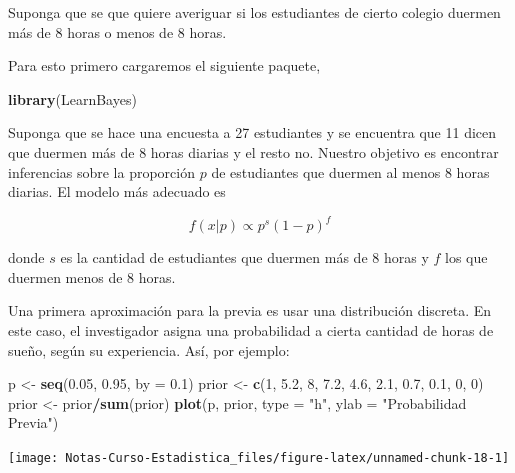 \documentclass[
  12pt,
]{book}
\newenvironment{Shaded}{\begin{snugshade}}{\end{snugshade}}
\newcommand{\DataTypeTok}[1]{\textcolor[rgb]{0.13,0.29,0.53}{#1}}
\newcommand{\DecValTok}[1]{\textcolor[rgb]{0.00,0.00,0.81}{#1}}
\newcommand{\FloatTok}[1]{\textcolor[rgb]{0.00,0.00,0.81}{#1}}
\newcommand{\KeywordTok}[1]{\textcolor[rgb]{0.13,0.29,0.53}{\textbf{#1}}}
\newcommand{\NormalTok}[1]{#1}
\newcommand{\OperatorTok}[1]{\textcolor[rgb]{0.81,0.36,0.00}{\textbf{#1}}}
\newcommand{\StringTok}[1]{\textcolor[rgb]{0.31,0.60,0.02}{#1}}
\begin{document}
Suponga que se que quiere averiguar si los estudiantes de cierto colegio duermen más de 8 horas o menos de 8 horas.

Para esto primero cargaremos el siguiente paquete,

\begin{Shaded}
\begin{Highlighting}[]
\KeywordTok{library}\NormalTok{(LearnBayes)}
\end{Highlighting}
\end{Shaded}

Suponga que se hace una encuesta a 27 estudiantes y se encuentra que 11 dicen que duermen más de 8 horas diarias y el resto no. Nuestro objetivo es encontrar inferencias sobre la proporción \(p\) de estudiantes que duermen al menos 8 horas diarias. El modelo más adecuado es

\[
f(x \vert p) \propto p^s (1-p)^f
\]

donde \(s\) es la cantidad de estudiantes que duermen más de 8 horas y \(f\) los que duermen menos de 8 horas.

Una primera aproximación para la previa es usar una distribución discreta. En este caso, el investigador asigna una probabilidad a cierta cantidad de horas de sueño, según su experiencia. Así, por ejemplo:

\begin{Shaded}
\begin{Highlighting}[]
\NormalTok{p \textless{}{-}}\StringTok{ }\KeywordTok{seq}\NormalTok{(}\FloatTok{0.05}\NormalTok{, }\FloatTok{0.95}\NormalTok{, }\DataTypeTok{by =} \FloatTok{0.1}\NormalTok{)}
\NormalTok{prior \textless{}{-}}\StringTok{ }\KeywordTok{c}\NormalTok{(}\DecValTok{1}\NormalTok{, }\FloatTok{5.2}\NormalTok{, }\DecValTok{8}\NormalTok{, }\FloatTok{7.2}\NormalTok{, }\FloatTok{4.6}\NormalTok{, }\FloatTok{2.1}\NormalTok{, }\FloatTok{0.7}\NormalTok{, }\FloatTok{0.1}\NormalTok{, }\DecValTok{0}\NormalTok{, }\DecValTok{0}\NormalTok{)}
\NormalTok{prior \textless{}{-}}\StringTok{ }\NormalTok{prior}\OperatorTok{/}\KeywordTok{sum}\NormalTok{(prior)}
\KeywordTok{plot}\NormalTok{(p, prior, }\DataTypeTok{type =} \StringTok{"h"}\NormalTok{, }\DataTypeTok{ylab =} \StringTok{"Probabilidad Previa"}\NormalTok{)}
\end{Highlighting}
\end{Shaded}

\begin{center}\texttt{[image: Notas-Curso-Estadistica\_files/figure-latex/unnamed-chunk-18-1]} \end{center}
\end{document}
